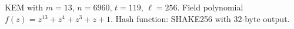 KEM with $m=13$, $n=6960$, $t=119$, $\ell=256$.
Field polynomial $f(z)=z^{13}+z^4+z^3+z+1$.
Hash function: SHAKE256 with $32$-byte output.
